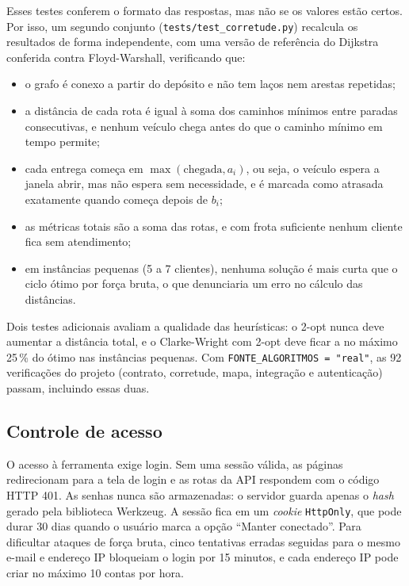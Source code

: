 \documentclass[12pt]{article}
\begin{document}
Esses testes conferem o formato das respostas, mas não se os valores estão certos. Por
isso, um segundo conjunto (\texttt{tests/test\_corretude.py}) recalcula os resultados de
forma independente, com uma versão de referência do Dijkstra conferida contra
Floyd-Warshall, verificando que:
\begin{itemize}
  \item o grafo é conexo a partir do depósito e não tem laços nem arestas repetidas;
  \item a distância de cada rota é igual à soma dos caminhos mínimos entre paradas
        consecutivas, e nenhum veículo chega antes do que o caminho mínimo em tempo
        permite;
  \item cada entrega começa em $\max(\text{chegada}, a_i)$, ou seja, o veículo espera a
        janela abrir, mas não espera sem necessidade, e é marcada como atrasada
        exatamente quando começa depois de $b_i$;
  \item as métricas totais são a soma das rotas, e com frota suficiente nenhum cliente
        fica sem atendimento;
  \item em instâncias pequenas (5 a 7 clientes), nenhuma solução é mais curta que o
        ciclo ótimo por força bruta, o que denunciaria um erro no cálculo das distâncias.
\end{itemize}

Dois testes adicionais avaliam a qualidade das heurísticas: o 2-opt nunca deve aumentar
a distância total, e o Clarke-Wright com 2-opt deve ficar a no máximo 25\,\% do ótimo
nas instâncias pequenas. Com \texttt{FONTE\_ALGORITMOS = "real"}, as 92 verificações do
projeto (contrato, corretude, mapa, integração e autenticação) passam, incluindo essas
duas.

\subsection{Controle de acesso}\label{sec:acesso}

O acesso à ferramenta exige login. Sem uma sessão válida, as páginas redirecionam para
a tela de login e as rotas da API respondem com o código HTTP 401. As senhas nunca são
armazenadas: o servidor guarda apenas o \textit{hash} gerado pela biblioteca Werkzeug. A
sessão fica em um \textit{cookie} \texttt{HttpOnly}, que pode durar 30 dias quando o
usuário marca a opção ``Manter conectado''. Para dificultar ataques de força bruta,
cinco tentativas erradas seguidas para o mesmo e-mail e endereço IP bloqueiam o login
por 15 minutos, e cada endereço IP pode criar no máximo 10 contas por hora.
\end{document}
